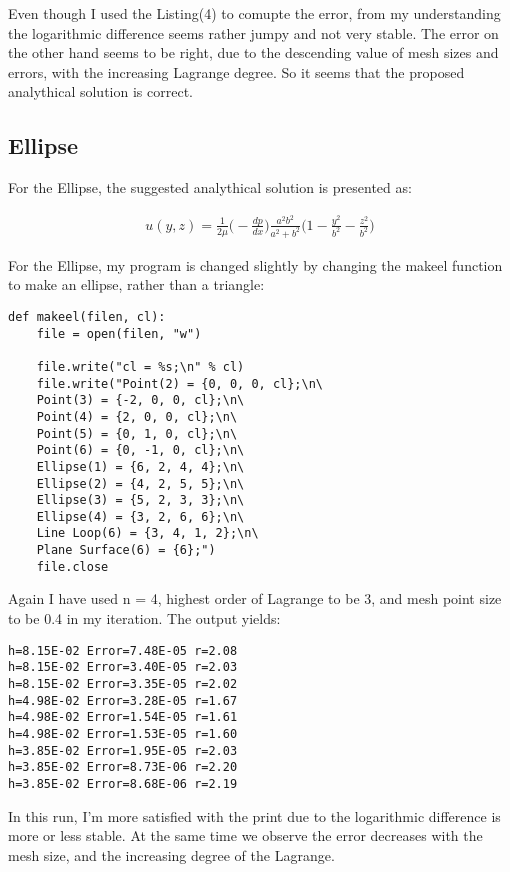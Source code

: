 \documentclass[a4paper,norsk]{article}
\begin{document}
Even though I used the Listing(4) to comupte the error, from my understanding the logarithmic difference seems rather jumpy and not very stable. \newline The error on the other hand seems to be right, due to the descending value of mesh sizes and errors, with the increasing Lagrange degree. So it seems that the proposed analythical solution is correct.

\newpage

\newpage

\subsection*{Ellipse}
For the Ellipse, the suggested analythical solution is presented as:

\begin{align*}
	u(y,z) = \frac{1}{2\mu}\Big(-\frac{dp}{dx} \Big) \frac{a^2b^2}{a^2+b^2} \Big( 1- \frac{y^2}{b^2}-\frac{z^2}{b^2} \Big)
\end{align*}

For the Ellipse, my program is changed slightly by changing the makeel function to make an ellipse, rather than a triangle:
\begin{lstlisting}[style=python]
def makeel(filen, cl):
	file = open(filen, "w")

	file.write("cl = %s;\n" % cl) 
	file.write("Point(2) = {0, 0, 0, cl};\n\
	Point(3) = {-2, 0, 0, cl};\n\
	Point(4) = {2, 0, 0, cl};\n\
	Point(5) = {0, 1, 0, cl};\n\
	Point(6) = {0, -1, 0, cl};\n\
	Ellipse(1) = {6, 2, 4, 4};\n\
	Ellipse(2) = {4, 2, 5, 5};\n\
	Ellipse(3) = {5, 2, 3, 3};\n\
	Ellipse(4) = {3, 2, 6, 6};\n\
	Line Loop(6) = {3, 4, 1, 2};\n\
	Plane Surface(6) = {6};")
	file.close
\end{lstlisting}
Again I have used n = 4, highest order of Lagrange to be 3, and mesh point size to be 0.4 in my iteration. The output yields:

\begin{lstlisting}[style=terminal]
h=8.15E-02 Error=7.48E-05 r=2.08
h=8.15E-02 Error=3.40E-05 r=2.03
h=8.15E-02 Error=3.35E-05 r=2.02
h=4.98E-02 Error=3.28E-05 r=1.67
h=4.98E-02 Error=1.54E-05 r=1.61
h=4.98E-02 Error=1.53E-05 r=1.60
h=3.85E-02 Error=1.95E-05 r=2.03
h=3.85E-02 Error=8.73E-06 r=2.20
h=3.85E-02 Error=8.68E-06 r=2.19
\end{lstlisting}
In this run, I'm more satisfied with the print due to the logarithmic difference is more or less stable. At the same time we observe the error decreases with the mesh size, and the increasing degree of the Lagrange.
\newpage
  
\newpage
\end{document}
